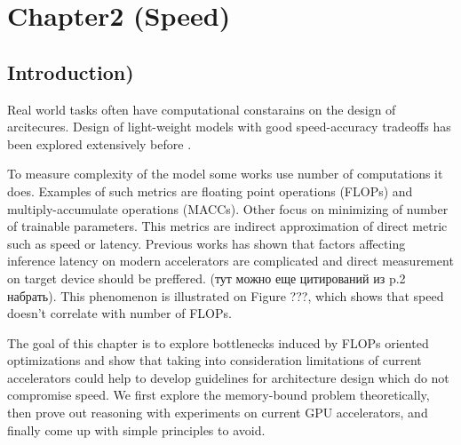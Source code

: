 \chapter{Chapter2 (Speed)}



\section{Introduction)}



Real world tasks often have computational constarains on the design of arcitecures. Design of light-weight models with good speed-accuracy tradeoffs has been explored extensively before \cite{howard2017_mobilenetv1} \cite{sandler2018_mobilenetv2} \cite{ma2018_shufflenetv2} \cite{zhang2018_shufflenet}.  %

To measure complexity of the model some works use number of computations it does. Examples of such metrics are floating point operations (FLOPs) and multiply-accumulate operations (MACCs). Other focus on minimizing of number of trainable parameters. This metrics are indirect approximation of direct metric such as speed or latency. Previous works has shown \cite{radosavovic2020_designing} \cite{lee2020_compounding_improvements} that factors affecting inference latency on modern accelerators are complicated and direct measurement on target device should be preffered. (тут можно еще цитирований из \cite{ma2018_shufflenetv2} p.2 набрать). This phenomenon is illustrated on Figure {???}, which shows that speed doesn't correlate with number of FLOPs.   

The goal of this chapter is to explore bottlenecks induced by FLOPs oriented optimizations and show that taking into consideration limitations of current accelerators could help to develop guidelines for architecture design which do not compromise speed. We first explore the memory-bound problem theoretically, then prove out reasoning with experiments on current GPU accelerators, and finally come up with simple principles to avoid. 

